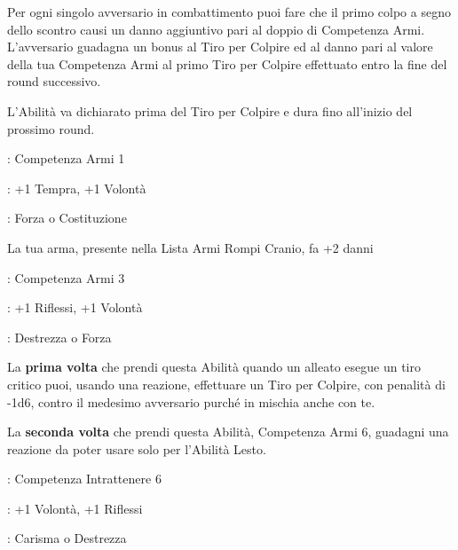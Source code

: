 \begin{multicols}{2}
Per ogni singolo avversario in combattimento puoi fare che il primo colpo a segno dello scontro causi un danno aggiuntivo pari al doppio di Competenza Armi. L'avversario guadagna un bonus al Tiro per Colpire ed al danno pari al valore della tua Competenza Armi al primo Tiro per Colpire effettuato entro la fine del round successivo.

L'Abilità va dichiarato prima del Tiro per Colpire e dura fino all'inizio del prossimo round.

\begin{description}[noitemsep, topsep=0pt, parsep=0pt, partopsep=0pt, leftmargin=0cm, labelwidth=2.5cm]
    \item[\textbf{Requisito}]: Competenza Armi 1
    \item[\textbf{Tiri Salvezza}]: +1 Tempra, +1 Volontà
    \item[\textbf{Caratteristica}]: Forza o Costituzione
\end{description}

La tua arma, presente nella Lista Armi Rompi Cranio, fa +2 danni

\begin{description}[noitemsep, topsep=0pt, parsep=0pt, partopsep=0pt, leftmargin=0cm, labelwidth=2.5cm]
    \item[\textbf{Requisito}]: Competenza Armi 3
    \item[\textbf{Tiri Salvezza}]: +1 Riflessi, +1 Volontà
    \item[\textbf{Caratteristica}]: Destrezza o Forza
\end{description}

La \textbf{prima volta} che prendi questa Abilità quando un alleato esegue un tiro critico puoi, usando una reazione, effettuare un Tiro per Colpire, con penalità di -1d6, contro il medesimo avversario purché in mischia anche con te.

La \textbf{seconda volta} che prendi questa Abilità, Competenza Armi 6, guadagni una reazione da poter usare solo per l'Abilità Lesto.

\begin{description}[noitemsep, topsep=0pt, parsep=0pt, partopsep=0pt, leftmargin=0cm, labelwidth=2.5cm]
    \item[\textbf{Requisito}]: Competenza Intrattenere 6
    \item[\textbf{Tiri Salvezza}]: +1 Volontà, +1 Riflessi
    \item[\textbf{Caratteristica}]: Carisma o Destrezza
\end{description}


\end{multicols}
